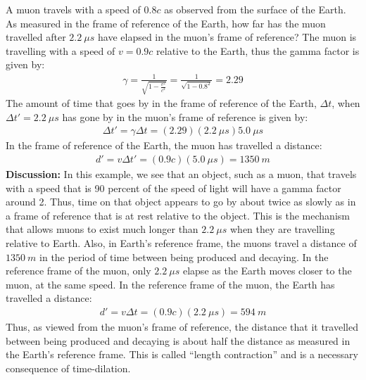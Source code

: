 \begin{example}{A muon travels with a speed of $0.8c$ as observed from the surface of the Earth. As measured in the frame of reference of the Earth, how far has the muon travelled after $\SI{2.2}{\mu s}$ have elapsed in the muon's frame of reference?}
The muon is travelling with a speed of $v=0.9c$ relative to the Earth, thus the gamma factor is given by:
\begin{align*}
\gamma = \frac{1}{\sqrt{1-\frac{v^2}{c^2}}} =\frac{1}{\sqrt{1-0.8^2}}=2.29
\end{align*}
The amount of time that goes by in the frame of reference of the Earth, $\Delta t$, when $\Delta t'=\SI{2.2}{\mu s}$ has gone by in the muon's frame of reference is given by:
\begin{align*}
\Delta t' = \gamma \Delta t = (2.29)(\SI{2.2}{\mu s})\SI{5.0}{\mu s}
\end{align*}
In the frame of reference of the Earth, the muon has travelled a distance:
\begin{align*}
d' = v\Delta t'=(0.9c)(\SI{5.0}{\mu s})=\SI{1350}{m}
\end{align*}
\textbf{Discussion: }In this example, we see that an object, such as a muon, that travels with a speed that is 90 percent of the speed of light will have a gamma factor around 2. Thus, time on that object appears to go by about twice as slowly as in a frame of reference that is at rest relative to the object. This is the mechanism that allows muons to exist much longer than $\SI{2.2}{\mu s}$ when they are travelling relative to Earth. Also, in Earth's reference frame, the muons travel a distance of $\SI{1350}{m}$ in the period of time between being produced and decaying. In the reference frame of the muon, only $\SI{2.2}{\mu s}$ elapse as the Earth moves closer to the muon, at the same speed. In the reference frame of the muon, the Earth has travelled a distance:
\begin{align*}
d' = v\Delta t=(0.9c)(\SI{2.2}{\mu s})=\SI{594}{m}
\end{align*}
Thus, as viewed from the muon's frame of reference, the distance that it travelled between being produced and decaying is about half the distance as measured in the Earth's reference frame. This is called ``length contraction'' and is a necessary consequence of time-dilation. 
\end{example}


